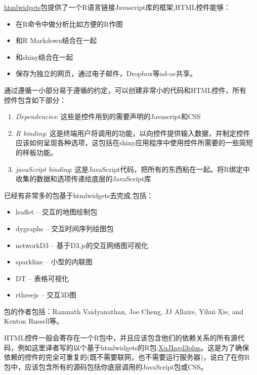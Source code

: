 \documentclass[]{book}
\theoremstyle{definition}
\theoremstyle{definition}
\theoremstyle{definition}
\theoremstyle{remark}
\begin{document}
\href{https://cran.r-project.org/web/packages/htmlwidgets/index.html}{htmlwidgets}包提供了一个R语言链接Javascript库的框架,HTML控件能够：

\begin{itemize}
\item
  在R命令中做分析比如方便的R作图
\item
  和R Markdown结合在一起
\item
  和shiny结合在一起
\item
  保存为独立的网页，通过电子邮件，Dropbox等ad-oc共享。
\end{itemize}

通过遵循一小部分易于遵循的约定，可以创建非常小的代码和HTML控件，所有控件包含如下部分：

\begin{enumerate}
\def\labelenumi{\arabic{enumi}.}
\item
  \emph{Dependencies}: 这些是控件用到的需要声明的Javascript和CSS
\item
  \emph{R binding}:
  这是终端用户将调用的功能，以向控件提供输入数据，并制定控件应该如何呈现各种选项，这包括在shiny应用程序中使用控件所需要的一些简短的样板功能。
\item
  \emph{javaScript binding}:
  这是JavaScript代码，把所有的东西粘在一起。将R绑定中收集的数据和选项传递给底层的JavaScript库
\end{enumerate}

已经有非常多的包基于htmlwidgets去完成,包括：

\begin{itemize}
\item
  leaflet -- 交互的地图绘制包
\item
  dygraphs -- 交互时间序列绘图包
\item
  networkD3 -- 基于D3.js的交互网络图可视化
\item
  sparkline -- 小型的内联图
\item
  DT -- 表格可视化
\item
  rthreejs -- 交互3D图
\end{itemize}

包的作者包括：Ramnath Vaidyanathan, Joe Cheng, JJ Allaire, Yihui Xie,
and Kenton Russell等。

HTML控件一般会寄存在一个R包中，并且应该包含他们的依赖关系的所有源代码，例如这里译者写的以个基于htmlwidgets的R包:\href{https://github.com/DataXujing/XuJIngd3plus}{XuJIngd3plus}。这是为了确保依赖的控件的完全可重复的(既不需要联网，也不需要运行服务器)，说白了在你R包中，应该包含所有的源码包括你底层调用的JavaScript包或CSS。
\end{document}
